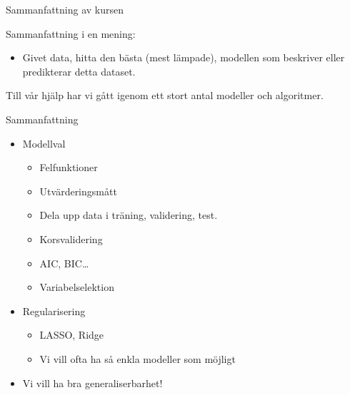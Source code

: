 \documentclass[10pt,english]{beamer}
\begin{document}
\begin{frame}{Sammanfattning av kursen}

    Sammanfattning i en mening:
    \begin{itemize}
        \item Givet data, hitta den bästa (mest lämpade), modellen som beskriver eller predikterar detta dataset.
    \end{itemize}

    Till vår hjälp har vi gått igenom ett stort antal modeller och algoritmer.
    
\end{frame}

\begin{frame}{Sammanfattning}
    \begin{itemize}
        \item Modellval
        \begin{itemize}
            \item Felfunktioner
            \item Utvärderingsmått
            \item Dela upp data i träning, validering, test.
            \item Korsvalidering
            \item AIC, BIC\dots
            \item Variabelselektion
        \end{itemize}
        \item Regularisering
        \begin{itemize}
            \item LASSO, Ridge
            \item Vi vill ofta ha så enkla modeller som möjligt
        \end{itemize}
        \item Vi vill ha bra generaliserbarhet!
    \end{itemize}
\end{frame}
\end{document}
